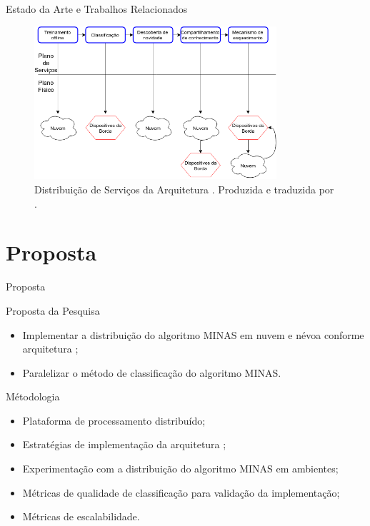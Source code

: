 \documentclass[aspectratio=43,10pt]{beamer}
\newcommand{\nota}[1]{\hspace*{-0.5cm}\textit{{\color[rgb]{1,0,0}Nota: #1}}}
\begin{document}
\begin{frame}[fragile]{Estado da Arte e Trabalhos Relacionados}
\begin{figure}[ht]
  \centering
  \includegraphics[width=0.8\textwidth]{figuras/idsa-iot-quali-004.png}
  \caption{Distribuição de Serviços da Arquitetura \arch.
  Produzida e traduzida por .}
  \label{fig:ids-iot}
\end{figure}
\end{frame}

\newcommand{\mfog}{sistema M-FOG\xspace}

\section{Proposta}
\begin{frame}[fragile]{Proposta}

\begin{block}{Proposta da Pesquisa}
  \begin{itemize}
    
    \item Implementar a distribuição do algoritmo MINAS em nuvem e névoa
    conforme arquitetura \arch;
    
    \item Paralelizar o método de classificação do algoritmo MINAS.
  \end{itemize}
\end{block}

\begin{alertblock}{Métodologia}
  \begin{itemize}[<+- | alert@+>]
    \item Plataforma de processamento distribuído;
    \item Estratégias de implementação da arquitetura \arch;
    \item Experimentação com a distribuição do algoritmo MINAS em ambientes;
    \item Métricas de qualidade de classificação para validação da implementação;
    \item Métricas de escalabilidade.
  \end{itemize}
\end{alertblock}
\end{frame}
\end{document}
